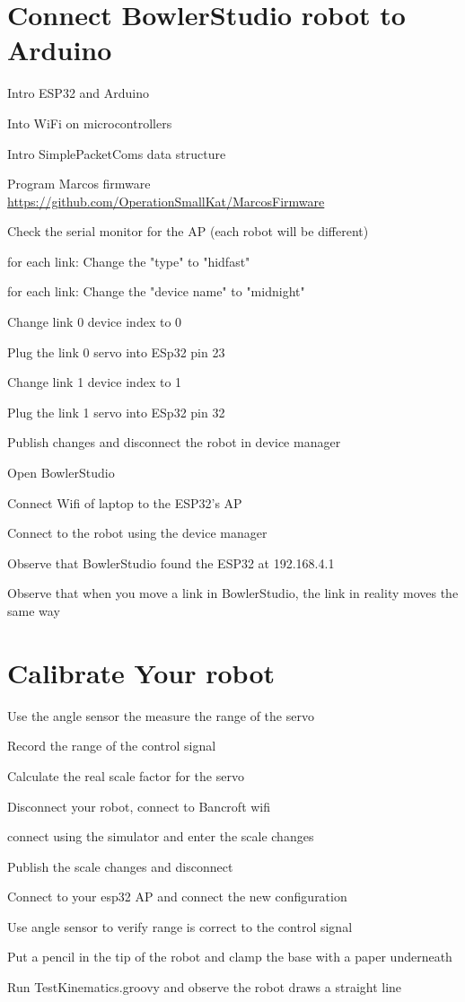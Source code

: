 \documentclass{article}
\begin{document}
\section{Connect BowlerStudio robot to Arduino}
\begin{todolist}
	\item Intro ESP32 and Arduino
	\item Into WiFi on microcontrollers
	\item Intro SimplePacketComs  data structure
	\item Program Marcos firmware \url{https://github.com/OperationSmallKat/MarcosFirmware}
	\item Check the serial monitor for the AP (each robot will be different)
	\item for each link: Change the "type" to "hidfast"
	\item for each link: Change the "device name" to "midnight" 
	\item Change link 0 device index to 0
	\item Plug the link 0 servo into ESp32 pin 23
	\item Change link 1 device index to 1
	\item Plug the link 1 servo into ESp32 pin 32
	\item Publish changes and disconnect the robot in device manager	
	\item Open BowlerStudio 
	\item Connect Wifi of laptop to the ESP32's AP
	\item Connect to the robot using the device manager
	\item Observe that BowlerStudio found the ESP32 at 192.168.4.1
	\item Observe that when you move a link in BowlerStudio, the link in reality moves the same way
\end{todolist}

\section{Calibrate Your robot}
\begin{todolist}
	\item Use the angle sensor the measure the range of the servo
	\item Record the range of the control signal
	\item Calculate the real scale factor for the servo
	\item Disconnect your robot, connect to Bancroft wifi
	\item connect using the simulator and enter the scale changes
	\item Publish the scale changes and disconnect
	\item Connect to your esp32 AP and connect the new configuration
	\item Use angle sensor to verify range is correct to the control signal
	\item Put a pencil in the tip of the robot and clamp the base with a paper underneath
	\item Run TestKinematics.groovy and observe the robot draws a straight line
\end{todolist}
\end{document}
